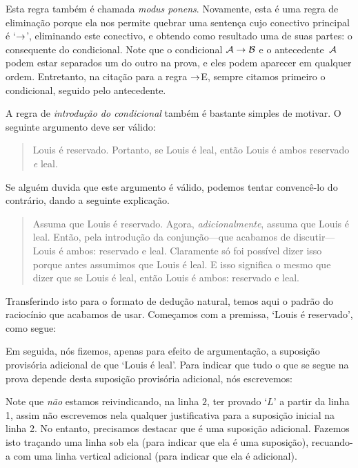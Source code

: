  Esta regra também é chamada  \emph{modus ponens}. Novamente, esta é uma regra de eliminação porque ela nos permite quebrar uma sentença cujo conectivo principal é `$\rightarrow$', eliminando este conectivo, e obtendo como resultado uma de suas partes: o consequente do condicional.
 Note que o condicional  $\mathcal{A}\rightarrow\mathcal{B}$ e o antecedente~$\mathcal{A}$ podem estar separados um do outro na prova, e eles podem aparecer em qualquer ordem. Entretanto, na citação para a regra $\rightarrow$E, sempre citamos primeiro o condicional, seguido pelo antecedente. 

A regra de \textit{introdução do condicional} também é bastante simples de motivar.  O seguinte argumento deve ser válido:
	\begin{quote}
		Louis é reservado.    Portanto, se Louis é leal, então Louis é ambos  reservado \emph{e} leal.
	\end{quote}
Se alguém duvida que este argumento é válido, podemos tentar convencê-lo do contrário, dando a seguinte explicação.
	\begin{quote}
		Assuma que  Louis é reservado.  Agora, \emph{adicionalmente}, assuma que Louis é leal.  Então, pela introdução da conjunção---que acabamos de discutir---Louis é ambos: reservado e leal.  Claramente só foi possível dizer isso porque antes assumimos que Louis é leal. E isso significa o mesmo que dizer que se Louis é leal, então Louis é ambos: reservado e leal.
	\end{quote}
Transferindo isto para o formato de dedução natural,  temos aqui o padrão do raciocínio  que acabamos de usar.  Começamos com a premissa, `Louis é reservado',  como segue: 

 
	\begin{fitchproof}
	\end{fitchproof}
Em seguida, nós fizemos, apenas para efeito de argumentação, a suposição provisória adicional de que ‘Louis é leal’. Para indicar que tudo o que se segue na prova depende desta suposição provisória adicional, nós escrevemos:

	\begin{fitchproof}
		\hypo{r}{R}
		\open
			\hypo{l}{L}
	\end{fitchproof}
Note que \emph{não}  estamos reivindicando, na linha $2$, ter provado  `$L$' a partir da linha 1, assim não escrevemos nela qualquer justificativa para a suposição inicial na linha 2. No entanto, precisamos destacar que é uma suposição adicional. Fazemos isto traçando uma linha sob ela (para indicar que ela é uma suposição), recuando-a com uma linha vertical adicional (para indicar que ela é adicional).

